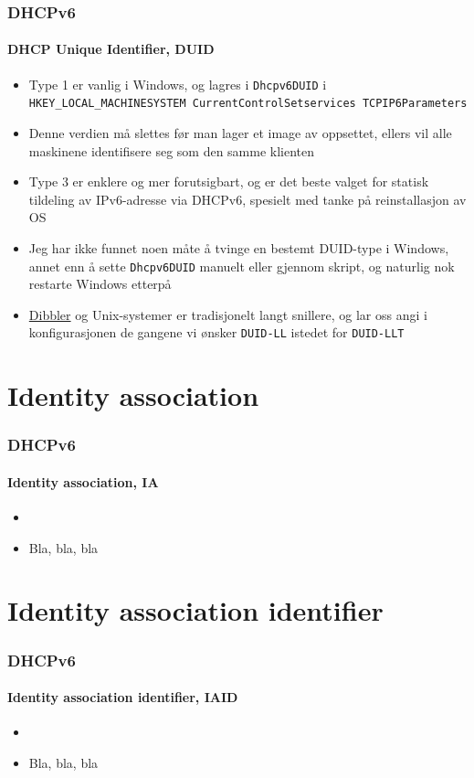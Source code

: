 \begin{frame}%
  \frametitle{DHCPv6}
  \framesubtitle{DHCP Unique Identifier, DUID}
  \pause
  \begin{itemize}[<+->]
  \item Type 1 er vanlig i Windows, og lagres i \texttt{Dhcpv6DUID} i
    \texttt{HKEY\_LOCAL\_MACHINE\Textbackslash SYSTEM\Textbackslash
      CurrentControlSet\Textbackslash services\Textbackslash
      TCPIP6\Textbackslash Parameters}
  \item Denne verdien må slettes før man lager et image av oppsettet,
    ellers vil alle maskinene identifisere seg som den samme klienten
  \item Type 3 er enklere og mer forutsigbart, og er det beste valget
    for statisk tildeling av IPv6-adresse via DHCPv6, spesielt med
    tanke på reinstallasjon av OS
  \item Jeg har ikke funnet noen måte å tvinge en bestemt DUID-type i
    Windows, annet enn å sette \texttt{Dhcpv6DUID} manuelt eller
    gjennom skript, og naturlig nok restarte Windows etterpå
  \item \href{http://klub.com.pl/dhcpv6/}{Dibbler} og Unix-systemer er
    tradisjonelt langt snillere, og lar oss angi i konfigurasjonen de
    gangene vi ønsker \texttt{DUID-LL} istedet for \texttt{DUID-LLT}
  \end{itemize}
\end{frame}

\section{Identity association}
\begin{frame}%
  \frametitle{DHCPv6}
  \framesubtitle{Identity association, IA}
  \pause
  \begin{itemize}[<+->]
  \item {}
  \item Bla, bla, bla
 \end{itemize}
\end{frame}

\section{Identity association identifier}
\begin{frame}%
  \frametitle{DHCPv6}
  \framesubtitle{Identity association identifier, IAID}
  \pause
  \begin{itemize}[<+->]
  \item {}
  \item Bla, bla, bla
 \end{itemize}
\end{frame}

